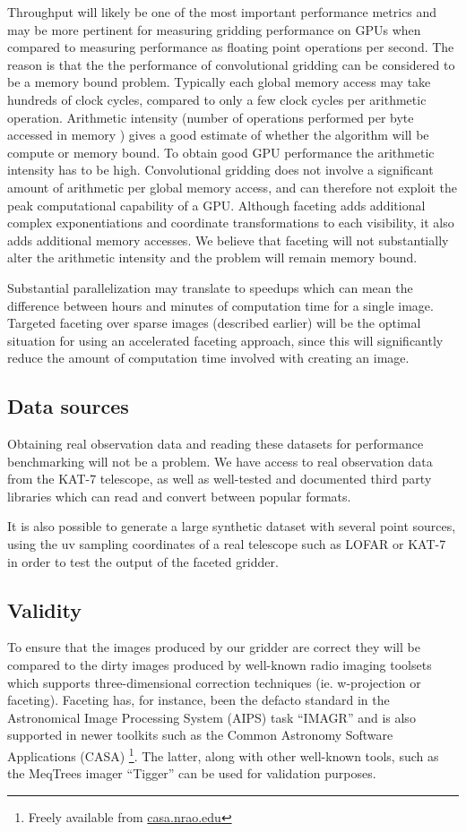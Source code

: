 \documentclass[a4paper, two column]{article}
\begin{document}
Throughput will likely be one of the most important performance metrics and may be more pertinent for measuring gridding performance on GPUs when compared to measuring performance 
as floating point operations per second. The reason is that the the performance of convolutional gridding can be considered to be a memory bound problem. Typically each global memory access may take hundreds of 
clock cycles, compared to only a few clock cycles per arithmetic operation. Arithmetic intensity (number of operations performed per byte accessed in memory \cite{sclocco2014auto}) gives a good estimate of 
whether the algorithm will be compute or memory bound. To obtain good GPU performance the arithmetic intensity has to be high. Convolutional gridding does not involve a significant amount of arithmetic per 
global memory access, and can therefore not exploit the peak computational capability of a GPU. Although faceting adds additional complex exponentiations and coordinate transformations to each visibility, it 
also adds additional memory accesses. We believe that faceting will not substantially alter the arithmetic intensity and the problem will remain memory bound.

Substantial parallelization may translate to speedups which can mean the difference between hours and minutes of computation time for a single image. Targeted faceting over sparse images (described earlier) will
be the optimal situation for using an accelerated faceting approach, since this will significantly reduce the amount of computation time involved with creating an image. 

\subsection{Data sources}
Obtaining real observation data and reading these datasets for performance benchmarking will not be a problem. We have access to real observation data 
from the KAT-7 telescope, as well as well-tested and documented third party libraries which can read and convert between popular formats. 

It is also possible to generate a large synthetic dataset with several point sources, using the uv sampling coordinates of a real telescope such as LOFAR or KAT-7 in order to 
test the output of the faceted gridder.

\subsection{Validity}
To ensure that the images produced by our gridder are correct they will be compared to the dirty images produced by well-known radio imaging toolsets which supports three-dimensional correction techniques (ie. w-projection or faceting). Faceting has,
for instance, been the defacto standard in the Astronomical Image Processing System (AIPS) task ``IMAGR'' \cite{AIPS113} and is also supported in newer toolkits such as the Common Astronomy Software Applications (CASA) \footnote{Freely available from \url{casa.nrao.edu}}. 
The latter, along with other well-known tools, such as the MeqTrees imager ``Tigger'' can be used for validation purposes.
\end{document}
